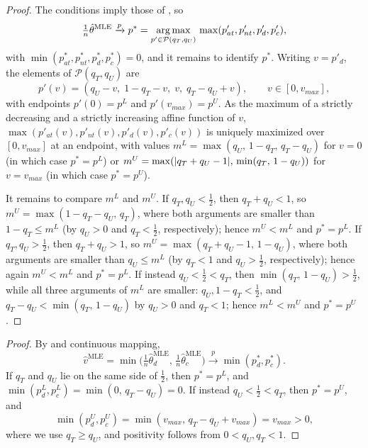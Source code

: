 \documentclass[12pt,reqno]{amsart}
\begin{document}
\mleconvergencesimpler*

\begin{proof}
    The conditions imply those of , so
    \[
        \tfrac{1}{n}\hat{\theta}^{\text{MLE}} \xrightarrow{p} p^* = \operatorname*{arg\,max}_{p' \in \mathcal{P}(q_T,q_U)}\, \max(p'_{at}, p'_{nt}, p'_d, p'_c),
    \]
    with $\min(p^*_{at}, p^*_{nt}, p^*_d, p^*_c) = 0$,
    and it remains to identify $p^*$.
    Writing $v = p'_d$, the elements of $\mathcal{P}(q_T,q_U)$ are
    \[
        p'(v) = (q_U - v,\; 1 - q_T - v,\; v,\; q_T - q_U + v),
        \qquad
        v \in [0, v_{max}],
    \]
    with endpoints $p'(0) = p^L$ and $p'(v_{max}) = p^U$.
    As the maximum of a strictly decreasing and a strictly increasing affine function of $v$, $\max(p'_{at}(v), p'_{nt}(v), p'_d(v), p'_c(v))$ is uniquely maximized over $[0,v_{max}]$ at an endpoint,
    with values $m^L = \max(q_U,\, 1 - q_T,\, q_T - q_U)$ for $v = 0$ (in which case $p^* = p^L$) or $m^U = \max(\lvert q_T + q_U - 1\rvert,\, \min(q_T,\, 1 - q_U))$ for $v = v_{max}$ (in which case $p^* = p^U$).

    It remains to compare $m^L$ and $m^U$.
    If $q_T, q_U < \tfrac{1}{2}$, then $q_T + q_U < 1$, so $m^U = \max(1 - q_T - q_U,\, q_T)$, where both arguments are smaller than $1 - q_T \leq m^L$ (by $q_U > 0$ and $q_T < \tfrac{1}{2}$, respectively); hence $m^U < m^L$ and $p^* = p^L$.
    If $q_T, q_U > \tfrac{1}{2}$, then $q_T + q_U > 1$, so $m^U = \max(q_T + q_U - 1,\, 1 - q_U)$, where both arguments are smaller than $q_U \leq m^L$ (by $q_T < 1$ and $q_U > \tfrac{1}{2}$, respectively); hence again $m^U < m^L$ and $p^* = p^L$.
    If instead $q_U < \tfrac{1}{2} < q_T$, then $\min(q_T,\, 1 - q_U) > \tfrac{1}{2}$, while all three arguments of $m^L$ are smaller: $q_U, 1 - q_T < \tfrac{1}{2}$, and $q_T - q_U < \min(q_T,\, 1 - q_U)$ by $q_U > 0$ and $q_T < 1$; hence $m^L < m^U$ and $p^* = p^U$.
\end{proof}


\mleviolation*

\begin{proof}
    By  and continuous mapping,
    \[
        \hat{v}^{\text{MLE}} = \min\bigl(\tfrac{1}{n}\hat{\theta}^{\text{MLE}}_d,\, \tfrac{1}{n}\hat{\theta}^{\text{MLE}}_c\bigr)
        \xrightarrow{p}
        \min(p^*_d, p^*_c).
    \]
    If $q_T$ and $q_U$ lie on the same side of $\tfrac{1}{2}$, then $p^* = p^L$, and $\min(p^L_d, p^L_c) = \min(0,\, q_T - q_U) = 0$. If instead $q_U < \tfrac{1}{2} < q_T$, then $p^* = p^U$, and
    \[
        \min(p^U_d, p^U_c) = \min(v_{max},\, q_T - q_U + v_{max}) = v_{max} > 0,
    \]
    where we use $q_T \geq q_U$, and positivity follows from $0 < q_U, q_T < 1$.
\end{proof}
\end{document}
